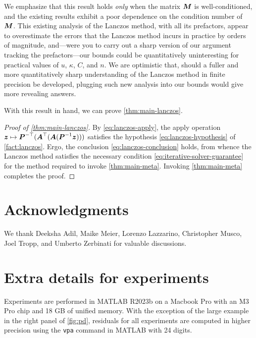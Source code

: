 \documentclass[onefignum,onetabnum,pagebackref,dvipsnames]{siamart220329}
\begin{document}
We emphasize that this result holds \emph{only} when the matrix $\boldsymbol{M}$ is well-conditioned, and the existing results exhibit a poor dependence on the condition number of $\boldsymbol{M}$.
This existing analysis of the Lanczos method, with all its prefactors, appear to overestimate the errors that the Lanczos method incurs in practice by orders of magnitude, and---were you to carry out a sharp version of our argument tracking the prefactors---our bounds could be quantitatively uninteresting for practical values of $u$, $\kappa$, $C$, and $n$.
We are optimistic that, should a fuller and more quantitatively sharp understanding of the Lanczos method in finite precision be developed, plugging such new analysis into our bounds would give more revealing answers.

With this result in hand, we can prove \cref{thm:main-lanczos}.


\begin{proof}[Proof of \cref{thm:main-lanczos}]
    By \cref{eq:lanczos-apply}, the apply operation $\boldsymbol{z} \mapsto \boldsymbol{P}^{-\top}(\boldsymbol{A}^\top(\boldsymbol{A}(\boldsymbol{P}^{-1}\boldsymbol{z})))$ satisfies the hypothesis \cref{eq:lanczos-hypothesis} of \cref{fact:lanczos}.
    Ergo, the conclusion \cref{eq:lanczos-conclusion} holds, from whence the Lanczos method satisfies the necessary condition \cref{eq:iterative-solver-guarantee} for the  method required to invoke \cref{thm:main-meta}.
    Invoking \cref{thm:main-meta} completes the proof.
\end{proof}


\section*{Acknowledgments}
We thank Deeksha Adil, Maike Meier, Lorenzo Lazzarino, Christopher Musco, Joel Tropp, and Umberto Zerbinati for valuable discussions.

\appendix

\section{Extra details for experiments} \label{sec:experiment-details}
Experiments are performed in MATLAB R2023b on a Macbook Pro with an M3 Pro chip and 18 GB of unified memory.
With the exception of the large example in the right panel of \cref{fig:pd}, residuals for all experiments are computed in higher precision using the \texttt{vpa} command in MATLAB with 24 digits.
\end{document}
